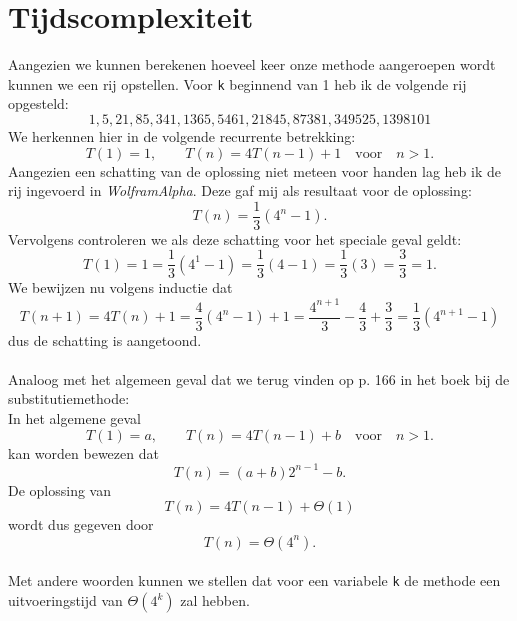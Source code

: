 \documentclass[12pt,a4paper]{report}
\begin{document}
\section*{Tijdscomplexiteit}
Aangezien we kunnen berekenen hoeveel keer onze methode aangeroepen wordt kunnen we een rij opstellen. Voor \texttt{k} beginnend van 1 heb ik de volgende rij opgesteld:
\begin{equation*}
1,5,21,85,341,1365,5461,21845,87381,349525,1398101
\end{equation*}
We herkennen hier in de volgende recurrente betrekking:
\begin{equation*}
T(1) = 1,\qquad T(n)=4T(n-1) + 1 \quad \text{voor} \quad n > 1.
\end{equation*}
Aangezien een schatting van de oplossing niet meteen voor handen lag heb ik de rij ingevoerd in \textsl{WolframAlpha}. Deze gaf mij als resultaat voor de oplossing:
\begin{equation*}
T(n) = \frac{1}{3}\left(4^n-1\right).
\end{equation*}
Vervolgens controleren we als deze schatting voor het speciale geval geldt:
\begin{equation*}
T(1) = 1 = \frac{1}{3}\left(4^1-1\right) = \frac{1}{3}\left(4-1\right) = \frac{1}{3}\left(3\right) = \frac{3}{3} = 1.
\end{equation*}
We bewijzen nu volgens inductie dat
\begin{equation*}
T(n+1) = 4T(n) + 1 = \frac{4}{3}(4^n-1)+1 = \frac{4^{n+1}}{3}-\frac{4}{3}+\frac{3}{3} = \frac{1}{3}(4^{n+1}-1)
\end{equation*}
dus de schatting is aangetoond.\\
\\
Analoog met het algemeen geval dat we terug vinden op p. 166 in het boek bij de substitutiemethode:\\
In het algemene geval
\begin{equation*}
T(1) = a,\qquad T(n)=4T(n-1) + b \quad \text{voor} \quad n > 1.
\end{equation*}
kan worden bewezen dat
\begin{equation*}
T(n)=(a+b)2^{n-1} -b.
\end{equation*}
De oplossing van
\begin{equation*}
T(n) = 4T(n-1)+\Theta(1)
\end{equation*}
wordt dus gegeven door
\begin{equation*}
T(n) = \Theta(4^n).
\end{equation*}
\\
Met andere woorden kunnen we stellen dat voor een variabele \texttt{k} de methode een uitvoeringstijd van $\Theta(4^k)$ zal hebben.
\end{document}
